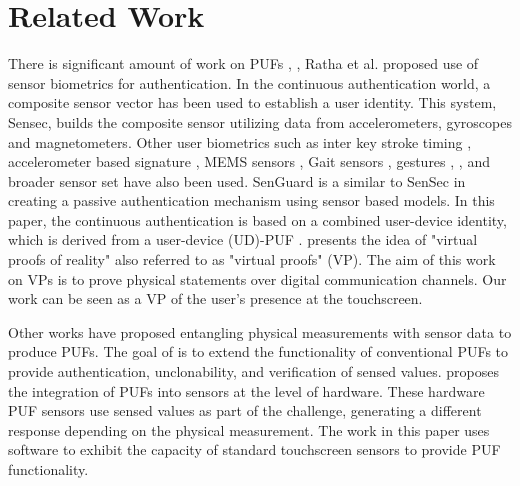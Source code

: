 \section{Related Work}
\label{related_work}
There is significant amount of work on PUFs \cite{Devadas:2009:PUF}, \cite{PUFIntro}, \cite{Gassend:2002:SPR}
Ratha et al. \cite{Ratha:2001} proposed use of sensor biometrics for authentication.
%
In the continuous authentication world, a composite sensor vector \cite{zhu2013sensec} has been used to establish a user identity. 
This system, Sensec, builds the composite sensor
utilizing data from accelerometers, gyroscopes and magnetometers.
%
Other user biometrics such as inter key stroke timing 
\cite{KeystrokeHASE14},  accelerometer based signature \cite{Liu:2009:UAP}, MEMS sensors
\cite{Aysu:2013:DFL}, Gait sensors \cite{Gait}, gestures \cite{touchscreengestures}, \cite{Gesture14}, and 
broader sensor set \cite{Dey:2013:AHP} have also been
used. 
SenGuard \cite{shi2011senguard} is a similar to SenSec in creating a passive
authentication mechanism using sensor based models. In this paper, the continuous authentication is based on a combined user-device identity,
which is derived from a user-device (UD)-PUF \cite{ScheelTyagi15}.
%
\cite{ruhrmair2015virtual} presents the idea of
"virtual proofs of reality" 
also referred to as "virtual proofs" (VP).
The aim of this work on VPs is
to prove physical statements over digital communication channels.
%
Our work can be seen as
a VP of the user's presence at the touchscreen.

Other works \cite{rosenfeld2010sensor} have proposed 
entangling physical measurements with sensor data
to produce PUFs.
%
The goal of \cite{rosenfeld2010sensor} is to 
extend the functionality of conventional PUFs
to provide authentication, unclonability, and verification of sensed values.
\cite{rosenfeld2010sensor} proposes the integration of PUFs into sensors
at the level of hardware.
These hardware PUF sensors use sensed values as part of the challenge,
generating a different response depending on the physical measurement.
%
The work in this paper uses software to exhibit
the capacity of standard touchscreen sensors to provide PUF functionality.


